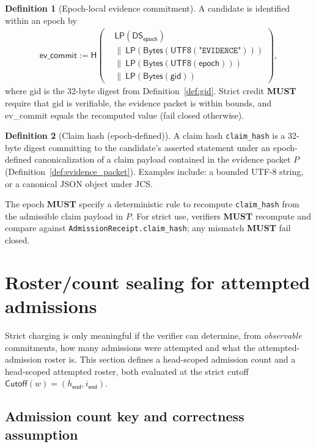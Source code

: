\documentclass[11pt]{article}
\newcommand{\MUST}{\textbf{MUST}}
\newcommand{\code}[1]{\texttt{#1}}
\newcommand{\1}{\mathbf{1}}
\newcommand{\Hash}{\mathsf{H}}
\newcommand{\DS}{\mathsf{DS}}
\newcommand{\LP}{\mathsf{LP}}
\theoremstyle{definition}
\newtheorem{definition}{Definition}
\theoremstyle{plain}
\begin{document}
\begin{definition}[Epoch-local evidence commitment]
\label{def:ev_commit}
A candidate is identified within an epoch by
\begin{align*}
\textsf{ev\_commit}:=\Hash\!\left(\begin{aligned}
&\LP(\DS_{\textsf{epoch}})\\
&\|\ \LP(\mathsf{Bytes}(\textsf{UTF8}(\texttt{"EVIDENCE"})))\\
&\|\ \LP(\mathsf{Bytes}(\textsf{UTF8}(\textsf{epoch})))\\
&\|\ \LP(\mathsf{Bytes}(\textsf{gid}))
\end{aligned}\right),
\end{align*}
where \textsf{gid} is the 32-byte digest from Definition~\ref{def:gid}. Strict credit \MUST{} require that \textsf{gid} is verifiable, the evidence packet is within bounds, and \textsf{ev\_commit} equals the recomputed value (fail closed otherwise).
\end{definition}

\begin{definition}[Claim hash (epoch-defined)]
\label{def:claim_hash}
A claim hash \code{claim\_hash} is a 32-byte digest committing to the candidate's asserted statement under an epoch-defined canonicalization of a claim payload contained in the evidence packet $P$ (Definition~\ref{def:evidence_packet}).
Examples include: a bounded UTF-8 string, or a canonical JSON object under JCS.

The epoch \MUST{} specify a deterministic rule to recompute \code{claim\_hash} from the admissible claim payload in $P$.
For strict use, verifiers \MUST{} recompute and compare against \code{AdmissionReceipt.claim\_hash}; any mismatch \MUST{} fail closed.
\end{definition}

\section{Roster/count sealing for attempted admissions}
\label{sec:roster_count}

Strict charging is only meaningful if the verifier can determine, from \emph{observable} commitments, how many admissions were attempted and what the attempted-admission roster is.
This section defines a head-scoped admission count and a head-scoped attempted roster, both evaluated at the strict cutoff $\textsf{Cutoff}(w)=(h_{\textsf{end}},i_{\textsf{end}})$.

\subsection{Admission count key and correctness assumption}
\label{sec:adm_count}
\end{document}
